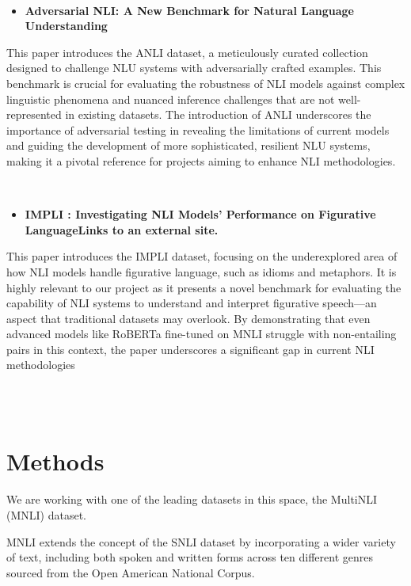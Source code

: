 \documentclass[11pt,a4paper]{article}
\begin{document}
\
\

\begin{itemize}
    \item \textbf{Adversarial NLI: A New Benchmark for Natural Language Understanding}
\end{itemize}
This paper introduces the ANLI dataset, a meticulously curated collection designed to challenge                NLU systems with adversarially crafted examples. This benchmark is crucial for evaluating the                 robustness of NLI models against complex linguistic phenomena and nuanced inference challenges         that are not well-represented in existing datasets. The introduction of ANLI underscores the                      importance of adversarial testing in revealing the limitations of current models and guiding the               development of more sophisticated, resilient NLU systems, making it a pivotal reference for                       projects aiming to enhance NLI methodologies.

\
\
\

\begin{itemize}
    \item \textbf{IMPLI : Investigating NLI Models’ Performance on Figurative LanguageLinks to an external site. }
\end{itemize}
This paper introduces the IMPLI dataset, focusing on the underexplored area of how NLI models handle figurative language, such as idioms and metaphors. It is highly relevant to our project as it presents a novel benchmark for evaluating the capability of NLI systems to understand and interpret figurative speech—an aspect that traditional datasets may overlook. By demonstrating that even advanced models like RoBERTa fine-tuned on MNLI struggle with non-entailing pairs in this context, the paper underscores a significant gap in current NLI methodologies


\\~\\

\section{Methods}
We are working with one of the leading datasets in this space, the MultiNLI (MNLI) dataset.

MNLI extends the concept of the SNLI dataset by incorporating a wider variety of text, including both spoken and written forms across ten different genres sourced from the Open American National Corpus.
\end{document}
